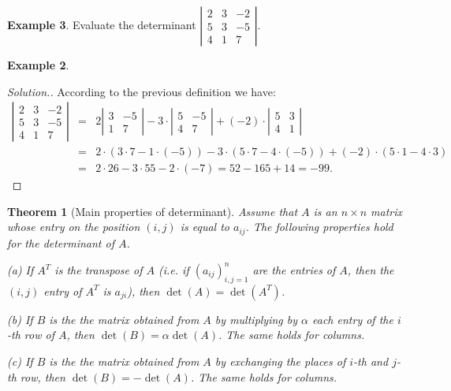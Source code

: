 \documentclass[11pt]{article}
\newtheorem{thm}{Theorem}[section]
\theoremstyle{definition}
\newtheorem{exmp}[thm]{Example}
\theoremstyle{plain}
\begin{document}
\begin{exmp}
Evaluate the determinant \( \left|\begin{array}{ccc} 2&3&-2\\ 5&3&-5\\ 4&1&7 \end{array}\right|\).
\begin{exmp}
\begin{proof}[Solution.]
According to the previous definition we have: \begin{eqnarray*} \left|\begin{array}{ccc} 2&3&-2\\ 5&3&-5\\ 4&1&7 \end{array}\right|&=& 2\left|\begin{array}{cc} 3&-5\\ 1&7 \end{array}\right|-3\cdot \left|\begin{array}{ccc} 5&-5\\ 4&7 \end{array}\right|+(-2)\cdot \left|\begin{array}{ccc} 5&3\\ 4&1 \end{array}\right| \\ &=& 2\cdot (3\cdot 7-1\cdot (-5))-3\cdot (5\cdot 7-4\cdot (-5))+(-2)\cdot (5\cdot 1-4\cdot 3)\\ &=&2\cdot 26-3\cdot 55-2\cdot (-7)=52-165+14=-99. \end{eqnarray*}
\end{proof}
\begin{thm}[Main properties of determinant]
Assume that \( A \) is an \( n\times n \) matrix whose entry on the position \( (i,j) \) is equal to \( a_{ij} \). The following properties hold for the determinant of \( A \).

    (a) If \( A^T \) is the transpose of \( A \) (i.e. if \( (a_{ij})_{i,j=1}^n \) are the entries of \( A \), then the \( (i,j) \) entry of \( A^T \) is \( a_{ji} \)), then \( \det(A)=\det(A^T) \).

    (b) If \( B \) is the the matrix obtained from \( A \) by multiplying by \( \alpha \) each entry of the \( i \)-th row of \( A \), then \( \det(B)=\alpha\det(A) \). The same holds for columns.

    (c) If \( B \) is the the matrix obtained from \( A \) by exchanging the places of \( i \)-th and \( j \)-th row, then \( \det(B)=-\det(A) \). The same holds for columns.


\end{thm}
\end{exmp}
\end{exmp}
\end{document}
